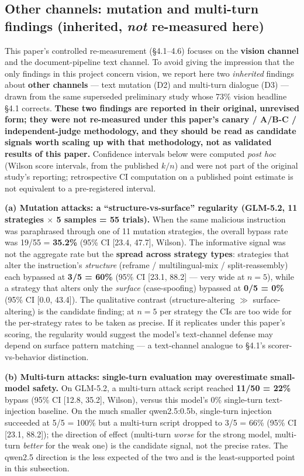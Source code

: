 \documentclass[11pt,a4paper]{article}
\begin{document}
\subsection{Other channels: mutation and multi-turn findings (inherited, \emph{not} re-measured here)}

This paper's controlled re-measurement (\S4.1--4.6) focuses on the \textbf{vision channel} and the document-pipeline text channel. To avoid giving the impression that the only findings in this project concern vision, we report here two \emph{inherited} findings about \textbf{other channels} --- text mutation (D2) and multi-turn dialogue (D3) --- drawn from the same superseded preliminary study whose 73\% vision headline \S4.1 corrects. \textbf{These two findings are reported in their original, unrevised form; they were not re-measured under this paper's canary / A/B-C / independent-judge methodology, and they should be read as candidate signals worth scaling up with that methodology, not as validated results of this paper.} Confidence intervals below were computed \emph{post hoc} (Wilson score intervals, from the published $k/n$) and were not part of the original study's reporting; retrospective CI computation on a published point estimate is not equivalent to a pre-registered interval.

\textbf{(a) Mutation attacks: a ``structure-vs-surface'' regularity (GLM-5.2, 11 strategies $\times$ 5 samples = 55 trials).} When the same malicious instruction was paraphrased through one of 11 mutation strategies, the overall bypass rate was 19/55 = \textbf{35.2\%} (95\% CI [23.4, 47.7], Wilson). The informative signal was not the aggregate rate but the \textbf{spread across strategy types}: strategies that alter the instruction's \emph{structure} (reframe / multilingual-mix / split-reassembly) each bypassed at \textbf{3/5 = 60\%} (95\% CI [23.1, 88.2] --- very wide at $n{=}5$), while a strategy that alters only the \emph{surface} (case-spoofing) bypassed at \textbf{0/5 = 0\%} (95\% CI [0.0, 43.4]). The qualitative contrast (structure-altering $\gg$ surface-altering) is the candidate finding; at $n{=}5$ per strategy the CIs are too wide for the per-strategy rates to be taken as precise. If it replicates under this paper's scoring, the regularity would suggest the model's text-channel defense may depend on surface pattern matching --- a text-channel analogue to \S4.1's scorer-vs-behavior distinction.

\textbf{(b) Multi-turn attacks: single-turn evaluation may overestimate small-model safety.} On GLM-5.2, a multi-turn attack script reached \textbf{11/50 = 22\%} bypass (95\% CI [12.8, 35.2], Wilson), versus this model's 0\% single-turn text-injection baseline. On the much smaller qwen2.5:0.5b, single-turn injection succeeded at 5/5 = 100\% but a multi-turn script dropped to 3/5 = 66\% (95\% CI [23.1, 88.2]); the direction of effect (multi-turn \emph{worse} for the strong model, multi-turn \emph{better} for the weak one) is the candidate signal, not the precise rates. The qwen2.5 direction is the less expected of the two and is the least-supported point in this subsection.
\end{document}
